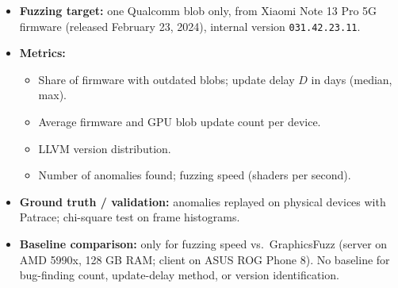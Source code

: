 \documentclass[11pt,a4paper]{article}
\begin{document}
\begin{enumerate}
\begin{itemize}[leftmargin=*, itemsep=1pt, topsep=2pt]
\begin{itemize}[itemsep=0pt]
            \item Execution and comparison: about 7 minutes.
        \end{itemize}
        \item \textbf{Fuzzing target:} one Qualcomm blob only, from Xiaomi Note 13 Pro 5G firmware (released February 23, 2024), internal version \texttt{031.42.23.11}.
        \item \textbf{Metrics:}
        \begin{itemize}[itemsep=0pt]
            \item Share of firmware with outdated blobs; update delay $D$ in days (median, max).
            \item Average firmware and GPU blob update count per device.
            \item LLVM version distribution.
            \item Number of anomalies found; fuzzing speed (shaders per second).
        \end{itemize}
        \item \textbf{Ground truth / validation:} anomalies replayed on physical devices with Patrace; chi-square test on frame histograms.
        \item \textbf{Baseline comparison:} only for fuzzing speed vs.\ GraphicsFuzz (server on AMD 5990x, 128 GB RAM; client on ASUS ROG Phone 8). No baseline for bug-finding count, update-delay method, or version identification.
    \end{itemize}


\end{enumerate}
\end{document}
